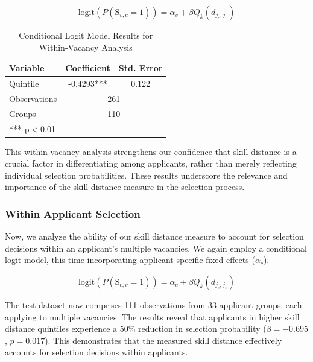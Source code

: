 \documentclass[12pt]{article}
\begin{document}
\begin{equation}
\text{logit}(P(\text{S}_{v,c} = 1)) = \alpha_v + \beta Q_k(d_{j_c,j_v})
\end{equation}

\begin{table}[h]
    \centering
    \caption{Conditional Logit Model Results for Within-Vacancy Analysis}
    \renewcommand{\arraystretch}{1.2}
    \begin{tabular}{lcc}
    \hline
    \textbf{Variable} & \textbf{Coefficient} & \textbf{Std. Error} \\
    \hline
    Quintile & -0.4293*** & 0.122 \\
    \hline
    Observations & \multicolumn{2}{c}{261} \\
    Groups & \multicolumn{2}{c}{110} \\
    \hline
    \multicolumn{3}{l}{\footnotesize{*** p$<$0.01}} \\
    \end{tabular}
    \label{tab:within_vacancy}
\end{table}

This within-vacancy analysis strengthens our confidence that skill distance is a crucial factor in differentiating among applicants, rather than merely reflecting individual selection probabilities. These results underscore the relevance and importance of the skill distance measure in the selection process. 



\subsubsection{Within Applicant Selection}

Now, we analyze the ability of our skill distance measure to account for selection decisions within an applicant's multiple vacancies. We again employ a conditional logit model, this time incorporating applicant-specific fixed effects ($\alpha_c$).


\begin{equation}
\text{logit}(P(\text{S}_{c,v} = 1)) = \alpha_c + \beta Q_k(d_{j_c,j_v})
\end{equation}

The test dataset now comprises 111 observations from 33 applicant groups, each applying to multiple vacancies. The results reveal that applicants in higher skill distance quintiles experience a 50\% reduction in selection probability (\(\beta = -0.695\), \(p = 0.017\)). This demonstrates that the measured skill distance effectively accounts for selection decisions within applicants. 
\end{document}
